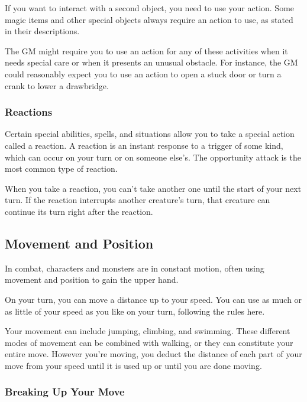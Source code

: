 \documentclass[
]{article}
\begin{document}
If you want to interact with a second object, you need to use your
action. Some magic items and other special objects always require an
action to use, as stated in their descriptions.

The GM might require you to use an action for any of these activities
when it needs special care or when it presents an unusual obstacle. For
instance, the GM could reasonably expect you to use an action to open a
stuck door or turn a crank to lower a drawbridge.

\hypertarget{reactions}{%
\subsubsection{Reactions}\label{reactions}}

Certain special abilities, spells, and situations allow you to take a
special action called a reaction. A reaction is an instant response to a
trigger of some kind, which can occur on your turn or on someone else's.
The opportunity attack is the most common type of reaction.

When you take a reaction, you can't take another one until the start of
your next turn. If the reaction interrupts another creature's turn, that
creature can continue its turn right after the reaction.

\hypertarget{movement-and-position}{%
\subsection{Movement and Position}\label{movement-and-position}}

In combat, characters and monsters are in constant motion, often using
movement and position to gain the upper hand.

On your turn, you can move a distance up to your speed. You can use as
much or as little of your speed as you like on your turn, following the
rules here.

Your movement can include jumping, climbing, and swimming. These
different modes of movement can be combined with walking, or they can
constitute your entire move. However you're moving, you deduct the
distance of each part of your move from your speed until it is used up
or until you are done moving.

\hypertarget{breaking-up-your-move}{%
\subsubsection{Breaking Up Your Move}\label{breaking-up-your-move}}
\end{document}
